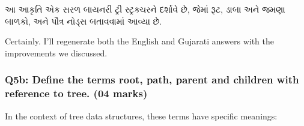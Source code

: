 \begin{Shaded}
\begin{Highlighting}[]
\end{Highlighting}
\end{Shaded}

આ આકૃતિ એક સરળ બાયનરી ટ્રી સ્ટ્રક્ચરને દર્શાવે છે, જેમાં રૂટ, ડાબા અને જમણા બાળકો, અને
પૌત્ર નોડ્સ બતાવવામાં આવ્યા છે.

Certainly. I'll regenerate both the English and Gujarati answers with
the improvements we discussed.

\hypertarget{q5b-define-the-terms-root-path-parent-and-children-with-reference-to-tree.-04-marks}{%
\subsubsection{Q5b: Define the terms root, path, parent and children
with reference to tree. (04
marks)}\label{q5b-define-the-terms-root-path-parent-and-children-with-reference-to-tree.-04-marks}}

In the context of tree data structures, these terms have specific
meanings:

